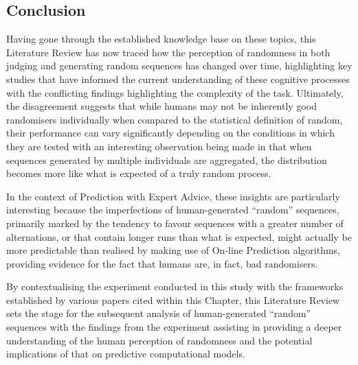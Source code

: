 
\newpage



\subsection{Conclusion}
Having gone through the established knowledge base on these topics, this Literature Review has now traced how the perception of randomness in both judging and generating random sequences has changed over time, highlighting key studies that have informed the current understanding of these cognitive processes with the conflicting findings highlighting the complexity of the task. Ultimately, the disagreement suggests that while humans may not be inherently good randomisers individually when compared to the statistical definition of random, their performance can vary significantly depending on the conditions in which they are tested with an interesting observation being made in that when sequences generated by multiple individuals are aggregated, the distribution becomes more like what is expected of a truly random process.

In the context of Prediction with Expert Advice, these insights are particularly interesting because the imperfections of human-generated ``random'' sequences, primarily marked by the tendency to favour sequences with a greater number of alternations, or that contain longer runs than what is expected, might actually be more predictable than realised by making use of On-line Prediction algorithms, providing evidence for the fact that humans are, in fact, bad randomisers.

By contextualising the experiment conducted in this study with the frameworks established by various papers cited within this Chapter, this Literature Review sets the stage for the subsequent analysis of human-generated ``random'' sequences with the findings from the experiment assisting in providing a deeper understanding of the human perception of randomness and the potential implications of that on predictive computational models.